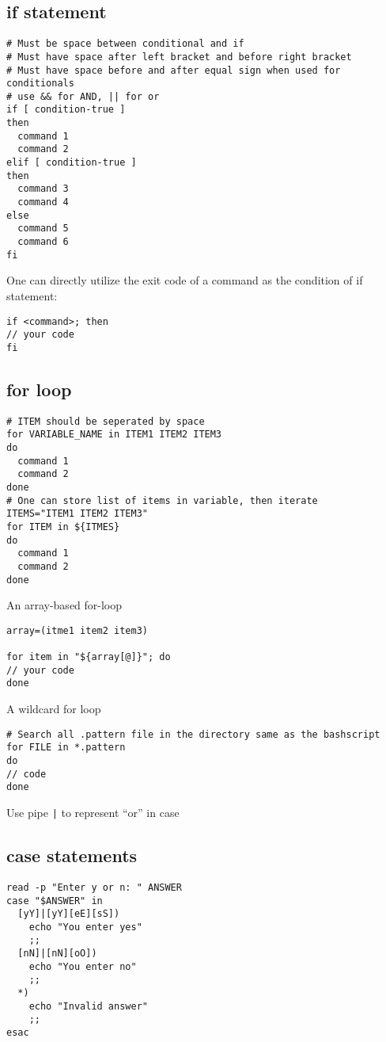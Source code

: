 \documentclass[12pt,a4paper]{article}
\begin{document}
\subsection{if statement}
\begin{footnotesize}
\begin{verbatim}
# Must be space between conditional and if
# Must have space after left bracket and before right bracket
# Must have space before and after equal sign when used for conditionals
# use && for AND, || for or
if [ condition-true ]
then
  command 1
  command 2
elif [ condition-true ]
then
  command 3
  command 4
else
  command 5
  command 6
fi
\end{verbatim}
\end{footnotesize}
One can directly utilize the exit code of a command as the condition of if statement:
\begin{footnotesize}
\begin{verbatim}
if <command>; then
// your code
fi
\end{verbatim}
\end{footnotesize}
\subsection{for loop}
\begin{footnotesize}
\begin{verbatim}
# ITEM should be seperated by space
for VARIABLE_NAME in ITEM1 ITEM2 ITEM3
do
  command 1
  command 2
done
# One can store list of items in variable, then iterate
ITEMS="ITEM1 ITEM2 ITEM3"
for ITEM in ${ITMES}
do
  command 1
  command 2
done
\end{verbatim}
\end{footnotesize}
An array-based for-loop
\begin{footnotesize}
\begin{verbatim}
array=(itme1 item2 item3)

for item in "${array[@]}"; do
// your code
done
\end{verbatim}
\end{footnotesize}
A wildcard for loop
\begin{footnotesize}
\begin{verbatim}
# Search all .pattern file in the directory same as the bashscript
for FILE in *.pattern
do
// code
done
\end{verbatim}
\end{footnotesize}
Use pipe \texttt{|} to represent ``or'' in case 
\subsection{case statements}
\begin{footnotesize}
\begin{verbatim}
read -p "Enter y or n: " ANSWER
case "$ANSWER" in
  [yY]|[yY][eE][sS])
    echo "You enter yes"
    ;;
  [nN]|[nN][oO])
    echo "You enter no"
    ;;
  *)
    echo "Invalid answer"
    ;;
esac
\end{verbatim}
\end{footnotesize}
\end{document}
